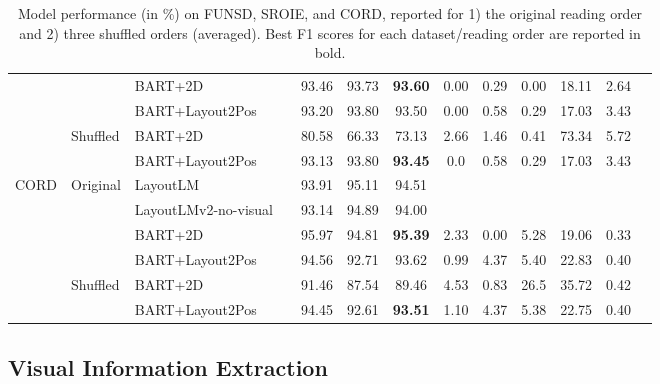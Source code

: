 \begin{table}[ht]
\begin{adjustbox}{max width=\textwidth}
\begin{threeparttable}
\begin{tabular}{lllcccccccccc}
      & & BART+2D & & 93.46 &	93.73 &	\textbf{93.60} & 0.00 &	0.29 &	0.00 &	18.11 &	2.64  \\
      & & BART+Layout2Pos & & 93.20 &	93.80 &	93.50 & 0.00 &	0.58 &	0.29 &	17.03 &	3.43 \\
      \cline{2-12}
      & \multirow{2}{*}{Shuffled} & BART+2D & & 80.58 & 66.33 & 73.13	 &  2.66 & 1.46 & 0.41 & 73.34 & 5.72 \\ 
      & & BART+Layout2Pos & & 93.13 &	93.80 &	\textbf{93.45} & 0.0 & 0.58 & 0.29 & 17.03 & 3.43 \\ 
      \midrule
      \multirow{6}{*}{CORD} & \multirow{4}{*}{Original} & LayoutLM  \citep{xu2020layoutlm} & & 93.91 & 95.11 & 94.51 & \cellcolor[gray]{0.9} & \cellcolor[gray]{0.9} & \cellcolor[gray]{0.9} & \cellcolor[gray]{0.9} & \cellcolor[gray]{0.9}  \\ 
      & & LayoutLMv2-no-visual             & & 93.14 &	94.89 &	94.00 & \cellcolor[gray]{0.9} & \cellcolor[gray]{0.9} & \cellcolor[gray]{0.9} & \cellcolor[gray]{0.9} &  \cellcolor[gray]{0.9} \\  
      & & BART+2D & & 95.97 &	94.81 &	\textbf{95.39} & 2.33 & 0.00 & 5.28 & 19.06 &	0.33 \\
      & & BART+Layout2Pos & & 94.56 &	92.71 &	93.62 & 0.99 & 4.37 & 5.40 & 22.83 & 0.40 \\
      \cline{2-12}
      & \multirow{2}{*}{Shuffled} & BART+2D & & 91.46 & 87.54 & 89.46	 & 4.53 & 0.83 & 26.5 & 35.72 & 0.42	 \\ 
      & & BART+Layout2Pos & & 94.45 & 92.61 &	\textbf{93.51} &  1.10 & 4.37 & 5.38 & 22.75 & 0.40  \\ 
      \bottomrule
  \end{tabular}
  \end{threeparttable}
  \end{adjustbox}
  \caption{Model performance (in \%) on FUNSD, SROIE, and CORD, reported for 1) the original reading order and 2) three shuffled orders (averaged). Best F1 scores for each dataset/reading order are reported in bold.}
  \label{table:visual-information-extraction-results}
\end{table}

\subsection{Visual Information Extraction}


